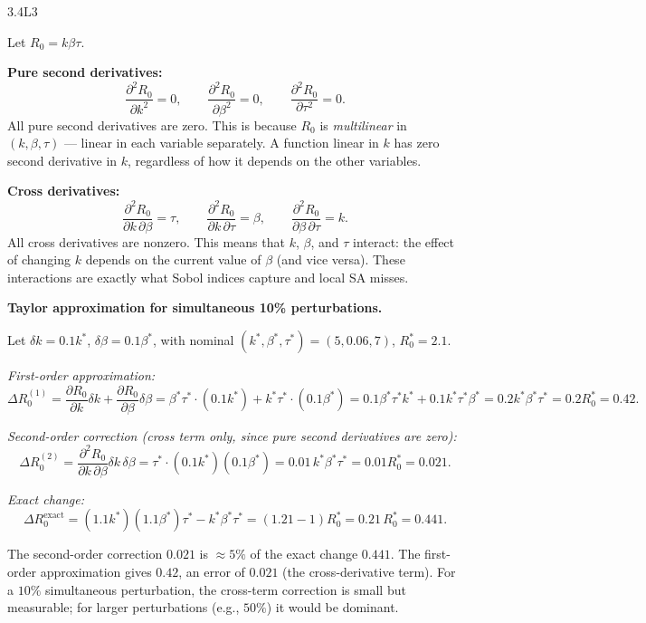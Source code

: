 \begin{solution}{3.4}{L3}

\solanswer

Let $R_0 = k\beta\tau$.

 \textbf{Pure second derivatives:}
\[
  \frac{\partial^2 R_0}{\partial k^2} = 0, \qquad
  \frac{\partial^2 R_0}{\partial\beta^2} = 0, \qquad
  \frac{\partial^2 R_0}{\partial\tau^2} = 0.
\]
All pure second derivatives are zero. This is because $R_0$ is
\emph{multilinear} in $(k,\beta,\tau)$ — linear in each variable
separately. A function linear in $k$ has zero second derivative
in $k$, regardless of how it depends on the other variables.

 \textbf{Cross derivatives:}
\[
  \frac{\partial^2 R_0}{\partial k\,\partial\beta} = \tau, \qquad
  \frac{\partial^2 R_0}{\partial k\,\partial\tau} = \beta, \qquad
  \frac{\partial^2 R_0}{\partial\beta\,\partial\tau} = k.
\]
All cross derivatives are nonzero. This means that $k$, $\beta$,
and $\tau$ interact: the effect of changing $k$ depends on the
current value of $\beta$ (and vice versa). These interactions
are exactly what Sobol indices capture and local SA misses.

 \textbf{Taylor approximation for simultaneous 10\% perturbations.}

Let $\delta k = 0.1k^*$, $\delta\beta = 0.1\beta^*$, with nominal
$(k^*, \beta^*, \tau^*) = (5, 0.06, 7)$, $R_0^* = 2.1$.

\textit{First-order approximation:}
\[
  \Delta R_0^{(1)} = \frac{\partial R_0}{\partial k}\delta k
                   + \frac{\partial R_0}{\partial\beta}\delta\beta
  = \beta^*\tau^*\cdot(0.1k^*) + k^*\tau^*\cdot(0.1\beta^*)
  = 0.1\beta^*\tau^*k^* + 0.1k^*\tau^*\beta^*
  = 0.2k^*\beta^*\tau^* = 0.2 R_0^* = 0.42.
\]

\textit{Second-order correction (cross term only, since pure second
derivatives are zero):}
\[
  \Delta R_0^{(2)} = \frac{\partial^2 R_0}{\partial k\,\partial\beta}
  \delta k\,\delta\beta
  = \tau^* \cdot (0.1k^*)(0.1\beta^*)
  = 0.01\,k^*\beta^*\tau^* = 0.01 R_0^* = 0.021.
\]

\textit{Exact change:}
\[
  \Delta R_0^{\text{exact}} = (1.1k^*)(1.1\beta^*)\tau^* - k^*\beta^*\tau^*
  = (1.21-1)R_0^* = 0.21\,R_0^* = 0.441.
\]

The second-order correction $0.021$ is $\approx 5\%$ of the exact
change $0.441$. The first-order approximation gives $0.42$, an error
of $0.021$ (the cross-derivative term). For a $10\%$ simultaneous
perturbation, the cross-term correction is small but measurable;
for larger perturbations (e.g., $50\%$) it would be dominant.


\end{solution}

